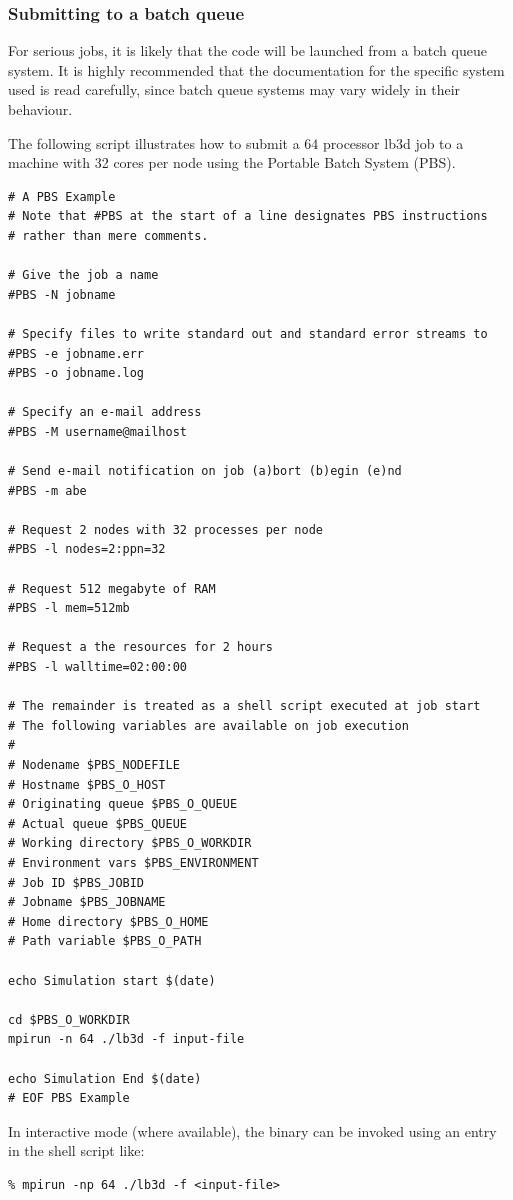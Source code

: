 \documentclass[a4paper]{article}
\begin{document}
\subsubsection{Submitting to a batch queue }

For serious jobs, it is likely that the code will be launched from a
batch queue system. It is highly recommended that the documentation for
the specific system used is read carefully, since batch queue systems
may vary widely in their behaviour.

The following script illustrates how to submit a $64$ processor lb3d job to a machine with 32 cores per node using the Portable Batch System (PBS).

\begin{verbatim}
# A PBS Example
# Note that #PBS at the start of a line designates PBS instructions
# rather than mere comments.

# Give the job a name
#PBS -N jobname

# Specify files to write standard out and standard error streams to
#PBS -e jobname.err
#PBS -o jobname.log

# Specify an e-mail address
#PBS -M username@mailhost

# Send e-mail notification on job (a)bort (b)egin (e)nd 
#PBS -m abe

# Request 2 nodes with 32 processes per node
#PBS -l nodes=2:ppn=32

# Request 512 megabyte of RAM
#PBS -l mem=512mb

# Request a the resources for 2 hours
#PBS -l walltime=02:00:00

# The remainder is treated as a shell script executed at job start
# The following variables are available on job execution
# 
# Nodename $PBS_NODEFILE
# Hostname $PBS_O_HOST
# Originating queue $PBS_O_QUEUE
# Actual queue $PBS_QUEUE
# Working directory $PBS_O_WORKDIR
# Environment vars $PBS_ENVIRONMENT
# Job ID $PBS_JOBID
# Jobname $PBS_JOBNAME
# Home directory $PBS_O_HOME
# Path variable $PBS_O_PATH

echo Simulation start $(date)

cd $PBS_O_WORKDIR
mpirun -n 64 ./lb3d -f input-file

echo Simulation End $(date)
# EOF PBS Example
\end{verbatim}

In interactive mode (where available), the binary can be invoked using an entry in the shell script like:
\begin{verbatim}
% mpirun -np 64 ./lb3d -f <input-file>
\end{verbatim}
\end{document}
